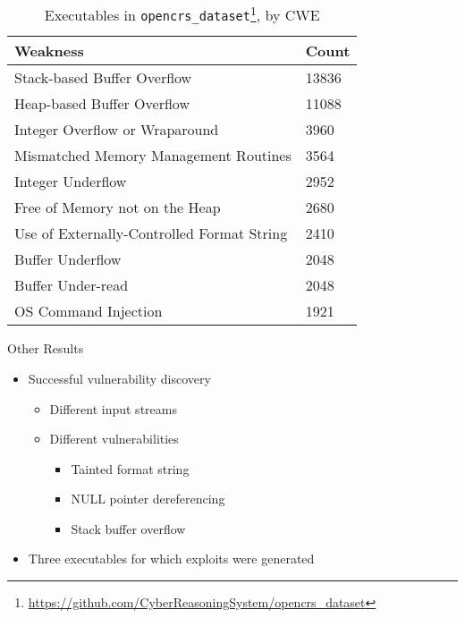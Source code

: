 \begin{frame}
    \begin{table}[]
        \centering
        \begin{tabular}{|l|l|}
            \hline
            Weakness                                   & Count \\ \hline
            Stack-based Buffer Overflow                & 13836 \\ \hline
            Heap-based Buffer Overflow                 & 11088 \\ \hline
            Integer Overflow or Wraparound             & 3960  \\ \hline
            Mismatched Memory Management Routines      & 3564  \\ \hline
            Integer Underflow                          & 2952  \\ \hline
            Free of Memory not on the Heap             & 2680  \\ \hline
            Use of Externally-Controlled Format String & 2410  \\ \hline
            Buffer Underflow                           & 2048  \\ \hline
            Buffer Under-read                          & 2048  \\ \hline
            OS Command Injection                       & 1921  \\ \hline
        \end{tabular}
        \caption{\label{executables-distribution}Executables in \texttt{opencrs\_dataset}\footnote{\href{https://github.com/CyberReasoningSystem/opencrs_dataset}{https://github.com/CyberReasoningSystem/opencrs\_dataset}}, by CWE}
    \end{table}

\end{frame}

\begin{frame}{Other Results}
    \begin{itemize}
        \item Successful vulnerability discovery
              \begin{itemize}
                  \item Different input streams
                  \item Different vulnerabilities
                        \begin{itemize}
                            \item \color{gray} Tainted format string
                            \item \color{gray} NULL pointer dereferencing
                            \item \color{gray} Stack buffer overflow
                        \end{itemize}
              \end{itemize} \pause
        \item Three executables for which exploits were generated
    \end{itemize}
\end{frame}